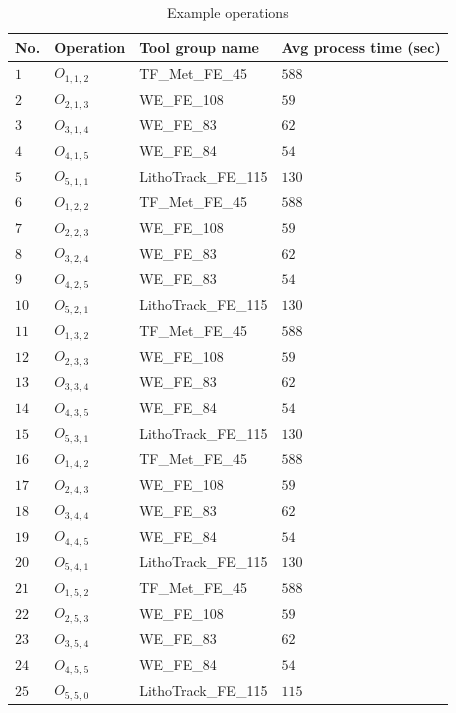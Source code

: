 \begin{table}[ht]
	\caption{Example operations}\label{tab:operations} \centering
	\begin{tabular}{|l|l|l|l|}
		\hline
		No. & Operation & Tool group name & Avg process time (sec)\\ \hline
		$1$ & $O_{1,1,2}$ & TF\_Met\_FE\_45 & $588$ \\
		$2$ & $O_{2,1,3}$ & WE\_FE\_108 & $59$ \\
		$3$ & $O_{3,1,4}$ & WE\_FE\_83 & $62$ \\
		$4$ & $O_{4,1,5}$ & WE\_FE\_84 & $54$ \\
		$5$ & $O_{5,1,1}$ & LithoTrack\_FE\_115 & $130$ \\
		$6$ & $O_{1,2,2}$ & TF\_Met\_FE\_45    & $588$ \\
		$7$ & $O_{2,2,3}$ & WE\_FE\_108 & $59$ \\
		$8$ & $O_{3,2,4}$ & WE\_FE\_83         & $62$ \\
		$9$ & $O_{4,2,5}$ & WE\_FE\_83    & $54$ \\
		$10$ & $O_{5,2,1}$ & LithoTrack\_FE\_115 & $130$ \\
		$11$ & $O_{1,3,2}$ & TF\_Met\_FE\_45         & $588$ \\
		$12$ & $O_{2,3,3}$ & WE\_FE\_108    & $59$ \\
		$13$ & $O_{3,3,4}$ & WE\_FE\_83 & $62$ \\
		$14$ & $O_{4,3,5}$ & WE\_FE\_84         & $54$ \\
		$15$ & $O_{5,3,1}$ & LithoTrack\_FE\_115    & $130$ \\
		$16$ & $O_{1,4,2}$ & TF\_Met\_FE\_45 & $588$ \\
		$17$ & $O_{2,4,3}$ & WE\_FE\_108         & $59$ \\
		$18$ & $O_{3,4,4}$ & WE\_FE\_83    & $62$ \\
		$19$ & $O_{4,4,5}$ & WE\_FE\_84 & $54$ \\
		$20$ & $O_{5,4,1}$ & LithoTrack\_FE\_115         & $130$ \\
		$21$ & $O_{1,5,2}$ & TF\_Met\_FE\_45   & $588$ \\
		$22$ & $O_{2,5,3}$ & WE\_FE\_108 & $59$ \\
		$23$ & $O_{3,5,4}$ & WE\_FE\_83         & $62$ \\
		$24$ & $O_{4,5,5}$ & WE\_FE\_84    & $54$ \\
		$25$ & $O_{5,5,0}$ & LithoTrack\_FE\_115 & $115$ \\
		\hline
	\end{tabular}
\end{table}

